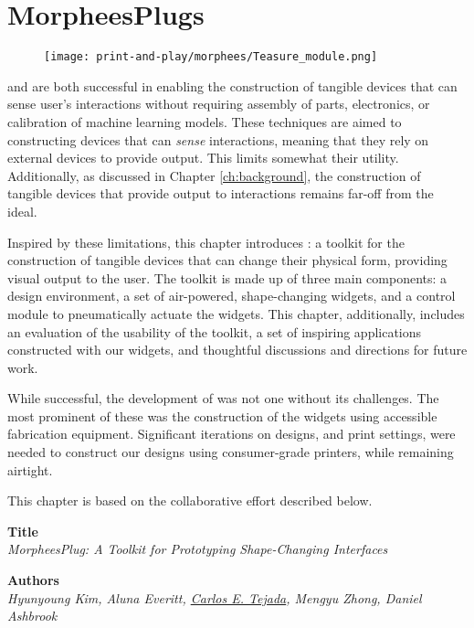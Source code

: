 \chapter{MorpheesPlugs} \label{ch:morphees}
  \begin{figure}[h]
    \centering
    \texttt{[image: print-and-play/morphees/Teasure\_module.png]}
  \end{figure}

  \at and \bh are both successful in enabling the construction of tangible
  devices that can sense user's interactions without requiring assembly of
  parts, electronics, or calibration of machine learning models. These
  techniques are aimed to constructing devices that can \emph{sense}
  interactions, meaning that they rely on external devices to provide output.
  This limits somewhat their utility. Additionally, as discussed in Chapter
  \ref{ch:background}, the construction of tangible devices that provide output
  to interactions remains far-off from the \papf ideal.

  Inspired by these limitations, this chapter introduces \mp: a toolkit for the
  construction of tangible devices that can change their physical form,
  providing visual output to the user. The \mp toolkit is made up of three main
  components: a design environment, a set of air-powered, shape-changing
  widgets, and a control module to pneumatically actuate the widgets. This
  chapter, additionally, includes an evaluation of the usability of the \mp
  toolkit, a set of inspiring applications constructed with our widgets, and
  thoughtful discussions and directions for future work.

  While successful, the development of \mp was not one without its challenges.
  The most prominent of these was the construction of the widgets using
  accessible fabrication equipment. Significant iterations on designs, and print
  settings, were needed to construct our designs using consumer-grade printers,
  while remaining airtight.
 

  \newpage

  This chapter is based on the collaborative effort described below.

  \vfill

  \noindent
  \textbf{Title}\\
  \textit{MorpheesPlug: A Toolkit for Prototyping Shape-Changing Interfaces}

  \bigskip

  \noindent
  \textbf{Authors}\\
  \textit{Hyunyoung Kim, Aluna Everitt, \underline{Carlos E. Tejada}, Mengyu Zhong, Daniel Ashbrook}

